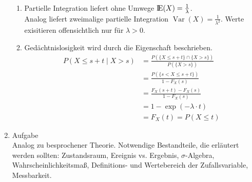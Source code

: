 \documentclass[12pt,a4paper]{article}
\newcommand{\E}{\mbox{I\negthinspace E}}
\DeclareMathOperator{\Var}{Var}
\begin{document}
\begin{enumerate}
\begin{enumerate}[label=(\roman*)]
\item Partielle Integration liefert ohne Umwege $\E (X) =  \frac{1}{\lambda}$. \\ Analog liefert zweimalige partielle Integration $\Var (X) = \frac{1}{\lambda^2}$. Werte exisitieren offensichtlich nur für $\lambda > 0$.

\item Gedächtnislosigkeit wird durch die Eigenschaft beschrieben.
\begin{align*} 
P(X \leq s+ t \mid X > s) &= \frac{P(\{ X \leq s + t\} \cap \{ X > s\} )}{P(\{ X >s\})}  \\ 
&=  \frac{P(\{s < X \leq s + t\})}{1 - F_X (s)} \\
&= \frac{F_X (s + t) - F_X (s)}{1 - F_X (s)} \\
&= 1 - \exp (- \lambda \cdot t) \\
&= F_X (t) = P(X \leq t)
\end{align*}

\end{enumerate}


\item Aufgabe  \\
Analog zu besprochener Theorie. Notwendige Bestandteile, die erläutert werden sollten: Zustandsraum, Ereignis vs. Ergebnis, $\sigma$-Algebra, Wahrscheinlichkeitsmaß, Definitions- und Wertebereich der Zufallsvariable, Messbarkeit.


\end{enumerate}
\end{document}
